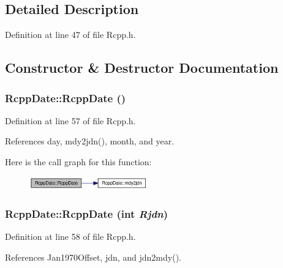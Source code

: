 \subsection{Detailed Description}


Definition at line 47 of file Rcpp.h.

\subsection{Constructor \& Destructor Documentation}
\hypertarget{classRcppDate_4f0f6ae9e9e284fd058d615bcd78d6f9}{
\subsubsection[{RcppDate}]{\setlength{\rightskip}{0pt plus 5cm}RcppDate::RcppDate ()}}
\label{classRcppDate_4f0f6ae9e9e284fd058d615bcd78d6f9}




Definition at line 57 of file Rcpp.h.

References day, mdy2jdn(), month, and year.

Here is the call graph for this function:\nopagebreak
\begin{figure}[H]
\begin{center}
\leavevmode
\includegraphics[width=145pt]{classRcppDate_4f0f6ae9e9e284fd058d615bcd78d6f9_cgraph}
\end{center}
\end{figure}
\hypertarget{classRcppDate_21adf306ddf84cf792f888d220bb9a3f}{
\subsubsection[{RcppDate}]{\setlength{\rightskip}{0pt plus 5cm}RcppDate::RcppDate (int {\em Rjdn})}}
\label{classRcppDate_21adf306ddf84cf792f888d220bb9a3f}




Definition at line 58 of file Rcpp.h.

References Jan1970Offset, jdn, and jdn2mdy().


